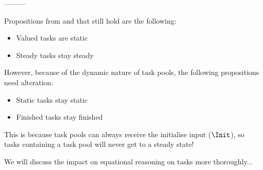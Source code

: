 ---------






Propositions from \cite{Steenvoorden22} and \cite{Klijnsma2020} that still hold are the following:

\begin{itemize}
  \item Valued tasks are static
  \item Steady tasks stay steady
\end{itemize}

However, because of the dynamic nature of task pools, the following propositions need alteration:

\begin{itemize}
  \item Static tasks stay static
  \item Finished tasks stay finished
\end{itemize}

This is because task pools can always receive the initialise input ($\Init$),
so tasks containing a task pool will never get to a steady state!

We will discuss the impact on equational reasoning on tasks more thoroughly...
